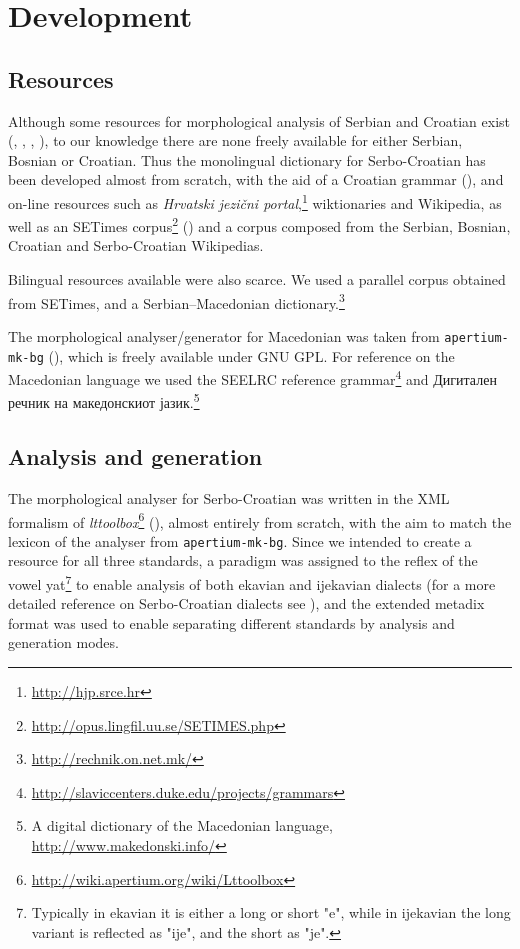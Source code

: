 \documentclass{book}
\begin{document}
\section{Development}
\subsection*{Resources}
Although some resources for morphological analysis of Serbian and Croatian exist
(\citealp{vitas2004intex}, \citealp{vitas2003processing}, \citealp{agic2008improving}, \citealp{snajder08automatic}), 
to our knowledge there are none freely available for either Serbian, Bosnian or 
Croatian. Thus the monolingual dictionary for Serbo-Croatian has been developed 
almost from scratch, with the aid of a Croatian grammar (\citealp{baric1997hrvatska}), 
and on-line resources such as \emph{Hrvatski jezični portal},\footnote{\url{http://hjp.srce.hr}}
wiktionaries and Wikipedia, as well as an SETimes corpus\footnote{\url{http://opus.lingfil.uu.se/SETIMES.php}} (\citealp{tyers2010south}) and a 
corpus composed from the Serbian, Bosnian, Croatian and Serbo-Croatian Wikipedias.

Bilingual resources available were also scarce. We used a parallel corpus obtained from
SETimes, and a Serbian--Macedonian %
dictionary.\footnote{\url{http://rechnik.on.net.mk/}}

The morphological analyser/generator for Macedonian was taken from
{\small{\tt apertium-mk-bg}} (\citealp{rangelov2011rule}), which is freely available under GNU GPL.
For reference on the Macedonian language we used the SEELRC reference grammar\footnote{\url{http://slaviccenters.duke.edu/projects/grammars}} and
Дигитален речник на македонскиот јазик.\footnote{A digital dictionary of the Macedonian language, \url{http://www.makedonski.info/}}

\subsection*{Analysis and generation}
The morphological analyser for Serbo-Croatian was written in the XML formalism of
\emph{lttoolbox}\footnote{\url{http://wiki.apertium.org/wiki/Lttoolbox}} (\citealp{rojas2005construccion}), almost entirely from scratch, with the
aim to match the lexicon of the analyser from {\small{\tt apertium-mk-bg}}. Since we intended to create a resource for all three
standards, a paradigm was assigned
to the reflex of the vowel yat\footnote{Typically in ekavian it is either a long or short "e", while in ijekavian the long variant is reflected as "ije", and the short as "je".} to enable analysis of both ekavian and ijekavian dialects (for a more detailed reference on Serbo-Croatian dialects see \citealp{brown2004handbook}), and the extended metadix format was used to enable separating different standards by
analysis and generation modes.
\end{document}
